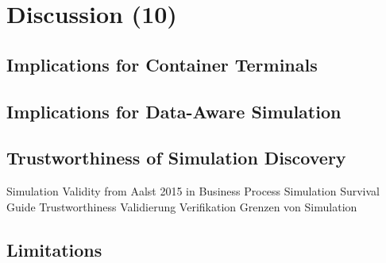 \chapter{Discussion (10)}
\label{chp:discussion}

\section{Implications for Container Terminals}
\section{Implications for Data-Aware Simulation}


\section{Trustworthiness of Simulation Discovery}
Simulation Validity from Aalst 2015 in Business Process Simulation Survival Guide
Trustworthiness
Validierung
Verifikation
Grenzen von Simulation

\section{Limitations}